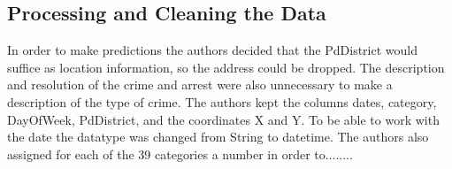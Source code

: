 \documentclass[../Main.tex]{subfiles}
\begin{document}
\subsection{Processing and Cleaning the Data}
In order to make predictions the authors decided that the PdDistrict would suffice as location information, so the address could be dropped. The description and resolution of the crime and arrest were also unnecessary to make a description of the type of crime.
The authors kept the columns dates, category, DayOfWeek, PdDistrict, and the coordinates X and Y.
To be able to work with the date the datatype was changed from String to datetime.
The authors also assigned for each of the 39 categories a number in order to........
\end{document}
